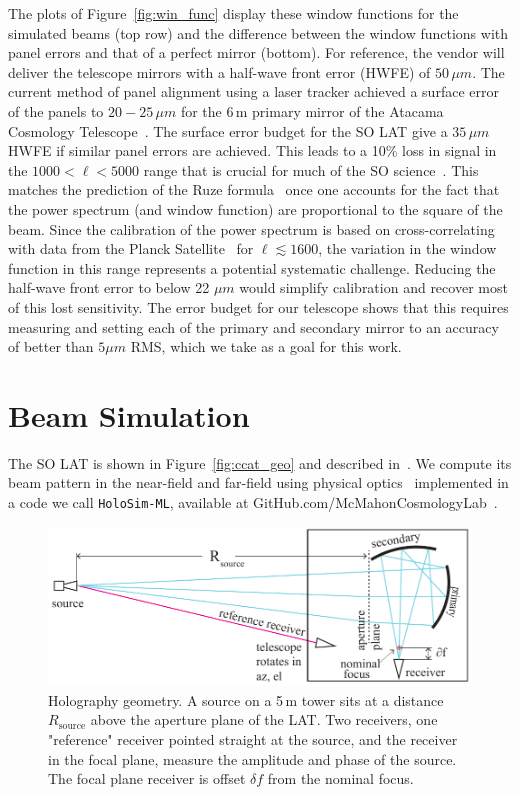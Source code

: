 The plots of Figure~\ref{fig:win_func} display these window functions for the simulated beams (top row) and the difference between the window functions with panel errors and that of a perfect mirror (bottom).  For reference, the vendor will deliver the telescope mirrors with a half-wave front error (HWFE) of $50\,\mu m$.  The current method of panel alignment using a laser tracker achieved a surface error of the panels to $20-25\,\mu  m$ for the 6\,m primary mirror of the Atacama Cosmology Telescope~\cite{act_inst}.  The surface error budget for the SO LAT give a $35\,\mu m$ HWFE if similar panel errors are achieved.  This leads to a 10\% loss in signal in the $1000<\ell < 5000$ range that is crucial for much of the SO science~\cite{so_science}.  This matches the prediction of the Ruze formula~\cite{ruze} once one accounts for the fact that the power spectrum (and window function) are proportional to the square of the beam.  Since the calibration of the power spectrum is based on cross-correlating with data from the Planck Satellite~\cite{planck_data} for $\ell \lesssim 1600$, the variation in the window function in this range represents a potential systematic challenge.  Reducing the half-wave front error to below 22 $\mu m$ would simplify calibration and recover most of this lost sensitivity.  The error budget for our telescope shows that this requires measuring and setting each of the primary and secondary mirror to an accuracy of better than $5 \mu m$ RMS, which we take as a goal for this work.

\section{Beam Simulation}
\label{sec:simulate}
The SO LAT is shown in Figure~\ref{fig:ccat_geo} and described in~\cite{2021RNAAS...5..100X}.  We compute its beam pattern in the near-field and far-field using physical optics~\cite{hecht,Gudmundsson:21} implemented in a code we call \verb|HoloSim-ML|, available at GitHub.com/McMahonCosmologyLab~\cite{McMahonCosmologyLab}.

\begin{figure}[b]
    \centering
    \includegraphics[width = .7\textwidth]{Figures/holography_geo3.pdf}
    \caption{Holography geometry. A source on a 5\,m tower sits at a distance $ R_{\text{source}}$ above the aperture plane of the LAT. Two receivers, one "reference" receiver pointed straight at the source, and the receiver in the focal plane, measure the amplitude and phase of the source. The focal plane receiver is offset $\delta f$ from the nominal focus.}
    \label{fig:hologeo}
\end{figure}

